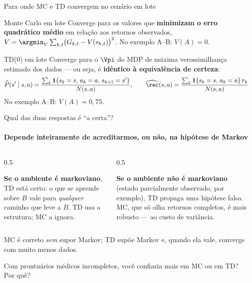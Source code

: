 \documentclass[aspectratio=169, 11pt]{beamer}
\newcommand{\Phat}{\widehat{P}}
\newcommand{\rhat}{\widehat{\rec}}
\begin{document}
\begin{frame}{Para onde MC e TD convergem no cenário em lote}

  \begin{teobox}{Monte Carlo em lote}
    Converge para os valores que \textbf{minimizam o erro quadrático médio}
    em relação aos retornos observados,
    $V = \argmin_{V} \sum_{k,t} \bigl(G_{k,t} - V(s_{k,t})\bigr)^2$.
    No exemplo A--B: $V(A) = 0$.
  \end{teobox}

  \begin{teobox}{TD(0) em lote}
    Converge para o $\Vpi$ do MDP de máxima verossimilhança estimado dos
    dados --- ou seja, é \textbf{idêntico à equivalência de certeza}:
    {\small
    \[
      \Phat(s' \mid s,a) = \frac{\sum_{k} \mathbf{1}\{s_k=s,\,a_k=a,\,s_{k+1}=s'\}}{N(s,a)},
      \qquad
      \rhat(s,a) = \frac{\sum_{k} \mathbf{1}\{s_k=s,\,a_k=a\}\,r_k}{N(s,a)}
    \]}
    \vspace{-0.7em}
    No exemplo A--B: $V(A) = 0{,}75$.
  \end{teobox}
\end{frame}

\begin{frame}{Qual das duas respostas é ``a certa''?}
  \framesubtitle{Depende inteiramente de acreditarmos, ou não, na hipótese de Markov}

  \begin{columns}[T]
    \begin{column}{0.5\textwidth}
      \begin{ideiabox}
        \textbf{Se o ambiente é markoviano}, TD está certo: o que se aprende
        sobre $B$ vale para \emph{qualquer} caminho que leve a $B$. TD usa a
        estrutura; MC a ignora.
      \end{ideiabox}
    \end{column}
    \begin{column}{0.5\textwidth}
      \begin{alertabox}
        \textbf{Se o ambiente não é markoviano} (estado parcialmente
        observado, por exemplo), TD propaga uma hipótese falsa. MC, que só
        olha retornos completos, é mais robusto — ao custo de variância.
      \end{alertabox}
    \end{column}
  \end{columns}

  \smallskip
  {\small MC é correto \emph{sem} supor Markov; TD supõe Markov e, quando
  ela vale, converge com muito menos dados.}

  \vspace{-0.4em}
  \begin{quizbox}{}
    Com prontuários médicos incompletos, você confiaria mais em MC ou em
    TD? Por quê?
  \end{quizbox}

\end{frame}
\end{document}
